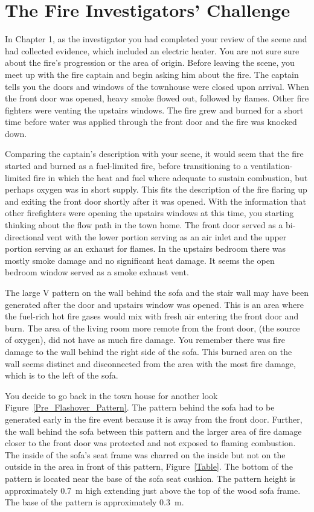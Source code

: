 \documentclass[twoside]{uocthesis}
\begin{document}
{\section{The Fire Investigators' Challenge}

In Chapter 1, as the investigator you had completed your review of the scene and had collected evidence, which included an electric heater.  You are not sure sure about the fire's progression or the area of origin.  Before leaving the scene, you meet up with the fire captain and begin asking him about the fire.  The captain tells you the doors and windows of the townhouse were closed upon arrival.  When the front door was opened, heavy smoke flowed out, followed by flames.  Other fire fighters were venting the upstairs windows.  The fire grew and burned for a short time before water was applied through the front door and the fire was knocked down.

Comparing the captain's description with your scene, it would seem that the fire started and burned as a fuel-limited fire, before transitioning to a ventilation-limited 
fire in which the heat and fuel where adequate to sustain combustion, but perhaps oxygen was in short supply.  This fits the description of the fire flaring up and exiting the front door shortly after it was opened.  With the information that other firefighters were opening the upstairs windows at this time, you starting thinking about the flow path in the town home.  The front door served as a bi-directional vent with the lower portion serving as an air inlet and the upper portion serving as an exhaust for flames.  In the upstairs bedroom there was mostly smoke damage and no significant heat damage. It seems the open bedroom window served as a smoke exhaust vent.         

The large V pattern on the wall behind the sofa and the stair wall may have been generated after the door and upstairs window was opened. This is an area where the fuel-rich hot fire gases would mix with fresh air entering the front door and burn.  The area of the living room more remote from the front door, (the source of oxygen), did not have as much fire damage.  You remember there was fire damage to the wall behind the right side of the sofa.  This burned area on the wall seems distinct and disconnected from the area with the most fire damage, which is to the left of the sofa.  

You decide to go back in the town house for another look Figure~\ref{Pre_Flashover_Pattern}.  The pattern behind the sofa had to be generated early in the fire event because it is away from the front door. Further, the wall behind the sofa between this pattern and the larger area of fire damage closer to the front door was protected and not exposed to flaming combustion.  The inside of the sofa's seat frame was charred on the inside but not on the outside in the area in front of this pattern, Figure~\ref{Table}.  The bottom of the pattern is located near the base of the sofa seat cushion.  The pattern height is approximately 0.7~m high extending just above the top of the wood sofa frame.  The base of the pattern is approximately 0.3~m.  

}
\end{document}
